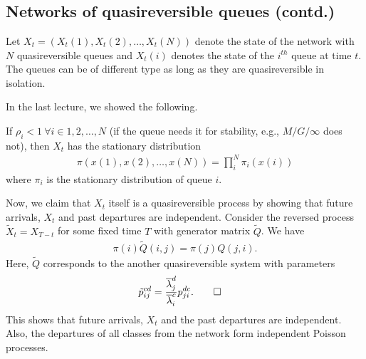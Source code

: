 \documentclass[all-lectures.tex]{subfiles}
\begin{document}

\setcounter{section}{4}
\setcounter{subsection}{1}

\section*{}
\chr
\subsection{Networks of quasireversible queues (contd.)}
\indent Let $X_t = (X_t(1),X_t(2),\dots,X_t(N))$ denote the state of the network with $N$ quasireversible queues and $X_t(i)$ denotes the state of the $i^{th}$ queue at time $t$. The queues can be of different type as long as they are quasireversible in isolation. 

In the last lecture, we showed the following. 

If $\rho_i < 1\ \forall i \in {1,2,\dots,N}$ (if the queue needs it for stability, e.g., $M/G/\infty$ does not), then $X_t$ has the stationary distribution 
\begin{align*}
\pi(x(1),x(2),\dots,x(N)) = \prod_{i}^N \pi_i(x(i))
\end{align*}
where $\pi_i$ is the stationary distribution of queue $i$.

Now, we claim that $X_t$ itself is a quasireversible process by showing that future arrivals, $X_t$ and past departures are independent. Consider the reversed process $\tilde{X}_t = X_{T-t}$ for some fixed time $T$ with generator matrix $\tilde{Q}$. We have 
\begin{align*}
\pi(i) \tilde{Q}(i,j) = \pi(j) Q(j,i).
\end{align*}
Here, $\tilde{Q}$ corresponds to the another quasireversible system with parameters 
\begin{align*}
\tilde{p}_{ij}^{cd} &= \frac{\overline{\lambda}_j^d}{\overline{\lambda}_i^c} p_{ji}^{dc}. \qedhere
\end{align*} 
This shows that future arrivals, $X_t$ and the past departures are independent. Also, the departures of all classes from the network form independent Poisson processes.\\
\end{document}
